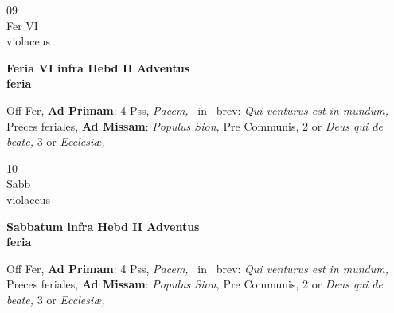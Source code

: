 \documentclass[10pt, openany]{book}
\begin{document}
        \begin{center}
            \begin{minipage}{3.5in}
                \vspace{2em}
                \begin{minipage}{0.5in}
                    {\Huge 09} \\
                    {\normalsize Fer VI} \\
                    {\normalsize violaceus}
                \end{minipage}
                \begin{minipage}{3.0in}
                    \textbf{ \large Feria VI infra Hebd II Adventus \\
                    \textnormal{\normalsize feria}} \\ 
                \end{minipage}
                \begin{justify}Off Fer, \textbf{Ad Primam}: 4 Pss, \textit{Pacem,} \Vbar\ in \Rbar\ brev: \textit{Qui venturus est in mundum,} Preces feriales, \textbf{Ad Missam}: \textit{Populus Sion,} Pre Communis, 2 or \textit{Deus qui de beate,} 3 or \textit{Ecclesiæ,}  
                \end{justify}
            \end{minipage}
        \end{center}
    
        \begin{center}
            \begin{minipage}{3.5in}
                \vspace{2em}
                \begin{minipage}{0.5in}
                    {\Huge 10} \\
                    {\normalsize Sabb} \\
                    {\normalsize violaceus}
                \end{minipage}
                \begin{minipage}{3.0in}
                    \textbf{ \large Sabbatum infra Hebd II Adventus \\
                    \textnormal{\normalsize feria}} \\ 
                \end{minipage}
                \begin{justify}Off Fer, \textbf{Ad Primam}: 4 Pss, \textit{Pacem,} \Vbar\ in \Rbar\ brev: \textit{Qui venturus est in mundum,} Preces feriales, \textbf{Ad Missam}: \textit{Populus Sion,} Pre Communis, 2 or \textit{Deus qui de beate,} 3 or \textit{Ecclesiæ,}  
                \end{justify}
            \end{minipage}
        \end{center}
    
\end{document}
